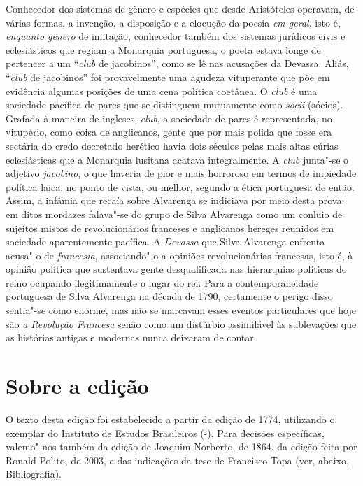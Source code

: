 Conhecedor dos sistemas de gênero e espécies que desde Aristóteles operavam, de
várias formas, a invenção, a disposição e a elocução da poesia \textit{em
geral}, isto é, \textit{enquanto gênero} de imitação, conhecedor também dos
sistemas jurídicos civis e eclesiásticos que regiam a Monarquia portuguesa, o
poeta estava longe de pertencer a um ``\textit{club} de jacobinos'', como se lê
nas acusações da Devassa. Aliás, ``\textit{club} de jacobinos'' foi
provavelmente uma agudeza vituperante que põe em evidência algumas posições de
uma cena política coetânea. O \textit{club} é uma sociedade pacífica de pares
que se distinguem mutuamente como \textit{socii} (sócios).  Grafada à maneira de
ingleses, \textit{club}, a sociedade de pares é representada, no vitupério, como
coisa de anglicanos, gente que por mais polida que fosse era sectária do credo
decretado herético havia dois séculos pelas mais altas cúrias eclesiásticas que
a Monarquia lusitana acatava integralmente. A \textit{club} junta"-se o adjetivo
\textit{jacobino}, o que haveria de pior e mais horroroso em termos de impiedade
política laica, no ponto de vista, ou melhor, segundo a ética portuguesa de
então.  Assim, a infâmia que recaía sobre Alvarenga se indiciava por meio desta
prova: em ditos mordazes falava"-se do grupo de Silva Alvarenga como um conluio
de sujeitos mistos de revolucionários franceses e anglicanos hereges reunidos em
sociedade aparentemente pacífica.  A \textit{Devassa} que Silva Alvarenga
enfrenta acusa"-o de \textit{francesia}, associando"-o a opiniões revolucionárias
francesas, isto é, à opinião política que sustentava gente desqualificada nas
hierarquias políticas do reino ocupando ilegitimamente o lugar do rei. Para a
contemporaneidade portuguesa de Silva Alvarenga na década de 1790, certamente o
perigo disso sentia"-se como enorme, mas não se marcavam esses eventos
particulares que hoje são \textit{a Revolução Francesa} senão como um distúrbio
assimilável às sublevações que as histórias antigas e modernas nunca deixaram de
contar.

\section{Sobre a edição}

O texto desta edição foi estabelecido a partir da edição de 1774,
utilizando o exemplar do Instituto de Estudos Brasileiros (-).
Para decisões específicas, valemo"-nos também da edição de Joaquim
Norberto, de 1864, da edição feita por Ronald Polito, de 2003, e
das indicações da tese de Francisco Topa (ver, abaixo, Bibliografia).

